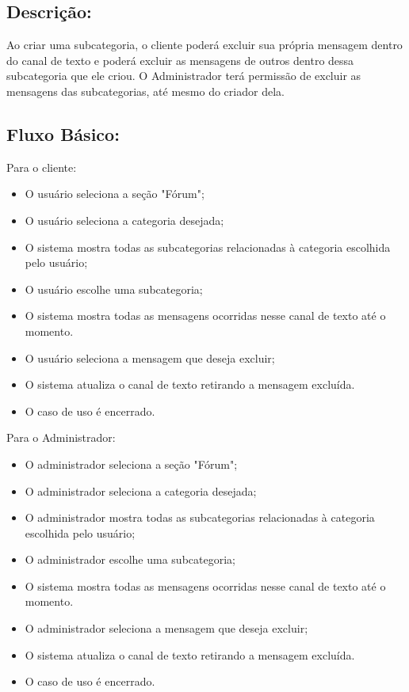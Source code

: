 \subsection{Descrição:}
Ao criar uma subcategoria, o cliente poderá excluir sua própria mensagem dentro do canal de texto e poderá excluir as mensagens de outros dentro dessa subcategoria que ele criou. O Administrador terá permissão de excluir as mensagens das subcategorias, até mesmo do criador dela.
\subsection{Fluxo Básico: }
Para o cliente:
\begin{itemize}
    \item O usuário seleciona a seção "Fórum";
    \item O usuário seleciona a categoria desejada;
    \item O sistema mostra todas as subcategorias relacionadas à categoria escolhida pelo usuário;
    \item O usuário escolhe uma subcategoria;
    \item O sistema mostra todas as mensagens ocorridas nesse canal de texto até o momento. 
    \item O usuário seleciona a mensagem que deseja excluir;
    \item O sistema atualiza o canal de texto retirando a mensagem excluída. 
    \item O  caso de uso é encerrado. 
\end{itemize}
Para o Administrador:
\begin{itemize}
    \item O administrador seleciona a seção "Fórum";
    \item O administrador seleciona a categoria desejada;
    \item O administrador mostra todas as subcategorias relacionadas à categoria escolhida pelo usuário;
    \item O administrador escolhe uma subcategoria;
    \item O sistema mostra todas as mensagens ocorridas nesse canal de texto até o momento. 
    \item O administrador seleciona a mensagem que deseja excluir;
    \item O sistema atualiza o canal de texto retirando a mensagem excluída. 
    \item O caso de uso é encerrado. 
\end{itemize}

